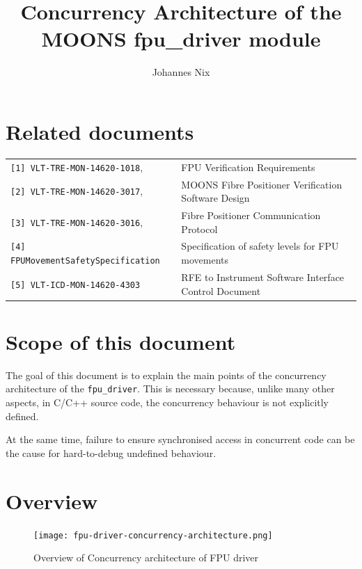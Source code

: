 \documentclass[fontsize=12,a4paper]{scrartcl}
\begin{document}
\title{Concurrency Architecture of the MOONS fpu\_driver module}


\author{Johannes Nix}

\maketitle

\tableofcontents

\section{Related documents}

\begin{tabular}{|ll|}
  \hline
\verb+[1] VLT-TRE-MON-14620-1018+, &  FPU Verification Requirements \\
\verb+[2] VLT-TRE-MON-14620-3017+, & MOONS Fibre Positioner Verification Software Design \\
\verb+[3] VLT-TRE-MON-14620-3016+, & Fibre Positioner Communication Protocol\\
\verb+[4] FPUMovementSafetySpecification+ & Specification of safety levels for FPU movements\\
\verb+[5] VLT-ICD-MON-14620-4303+ & RFE to Instrument Software Interface Control Document \\
\hline
\end{tabular}


\section{Scope of this document}

The goal of this document is to explain the main points of the
concurrency architecture of the \texttt{fpu\_driver}.  This is
necessary because, unlike many other aspects, in C/C++ source code,
the concurrency behaviour is not explicitly defined.

At the same time, failure to ensure synchronised access
in concurrent code can be the cause for hard-to-debug
undefined behaviour.

\section{Overview}

\begin{figure}
\texttt{[image: fpu-driver-concurrency-architecture.png]}
\caption{Overview of Concurrency architecture of FPU driver}
\label{fig:overview}
\end{figure}
\end{document}
